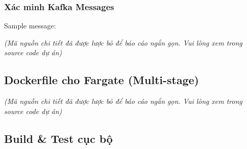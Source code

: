 \hypertarget{xuxe1c-minh-kafka-messages}{%
\subsubsection{Xác minh Kafka
Messages}}

\begin{Shaded}
\begin{Highlighting}[]
\DataTypeTok{\textbackslash{}}
  \DataTypeTok{\textbackslash{}}
  \DataTypeTok{\textbackslash{}}
   \DataTypeTok{\textbackslash{}}
\end{Highlighting}
\end{Shaded}

Sample message:

\emph{(Mã nguồn chi tiết đã được lược bỏ để báo cáo ngắn gọn. Vui lòng
xem trong source code dự án)}

\hypertarget{dockerfile-cho-fargate-multi-stage}{%
\subsection{Dockerfile cho Fargate
(Multi-stage)}}

\emph{(Mã nguồn chi tiết đã được lược bỏ để báo cáo ngắn gọn. Vui lòng
xem trong source code dự án)}

\hypertarget{build-test-cux1ee5c-bux1ed9}{%
\subsection{Build \& Test cục bộ}}

\begin{Shaded}
\begin{Highlighting}[]

 \DataTypeTok{\textbackslash{}}
  \DataTypeTok{\textbackslash{}}
  \DataTypeTok{\textbackslash{}}
  \DataTypeTok{\textbackslash{}}
\end{Highlighting}
\end{Shaded}

